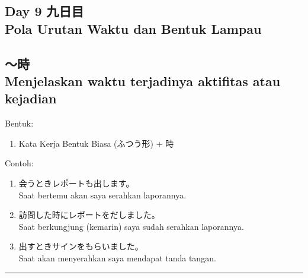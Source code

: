 \begin{flushright}
    \section*{\Large{Day 9 九日目 \\
    Pola Urutan Waktu dan Bentuk Lampau}}
\end{flushright}

\subsection*{
    ～時 \\ 
    Menjelaskan waktu terjadinya aktifitas atau kejadian
}
Bentuk:
\begin{enumerate}
    \item Kata Kerja Bentuk Biasa (ふつう形) + 時
\end{enumerate}
Contoh: 
\begin{enumerate}
    \item 会うときレポートも出します。
    \\ Saat bertemu akan saya serahkan laporannya.
    \item 訪問した時にレポートをだしました。
    \\ Saat berkungjung (kemarin) saya sudah serahkan laporannya.
    \item 出すときサインをもらいました。
    \\ Saat akan menyerahkan saya mendapat tanda tangan.
\end{enumerate}

\vspace{0.2cm}\hrule height 1pt\vspace{0.2cm}


